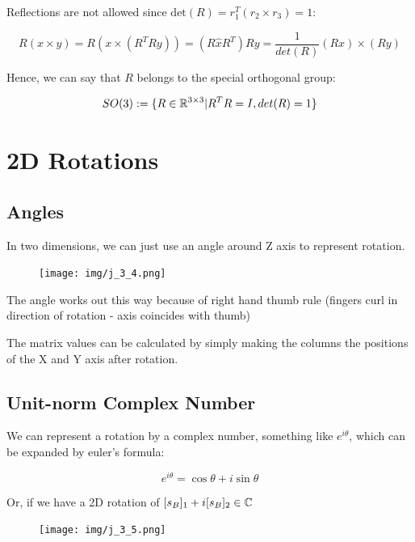 Reflections are not allowed since $\text{det}(R) = r_1^T(r_2\times r_3) = 1$:

\begin{equation*}
    R(x\times y) = R(x\times (R^TRy)) = (R\hat{x}R^T)Ry = \frac{1}{det(R)}(Rx)\times (Ry)
\end{equation*}

Hence, we can say that $R$ belongs to the special orthogonal group:

\begin{equation*}
    SO(3) : = \{ R\in \mathbb{R}^{3\times 3} | R^TR = I, det(R) = 1\}
\end{equation*}

\section{2D Rotations}

\subsection{Angles}

In two dimensions, we can just use an angle around Z axis to represent rotation.

\begin{figure}[h]\centering\texttt{[image: img/j\_3\_4.png]}\end{figure}

The angle works out this way because of right hand thumb rule (fingers curl in direction of rotation - axis coincides with thumb)

The matrix values can be calculated by simply making the columns the positions of the X and Y axis after rotation.

\subsection{Unit-norm Complex Number}

We can represent a rotation by a complex number, something like $e^{i\theta}$, which can be expanded by euler's formula:

\begin{equation*}
    e^{i\theta} = \cos\theta + i\sin\theta
\end{equation*}

Or, if we have a 2D rotation of $[s_B]_1 + i[s_B]_2\in \mathbb{C}$

\begin{figure}[h]\centering\texttt{[image: img/j\_3\_5.png]}\end{figure}

